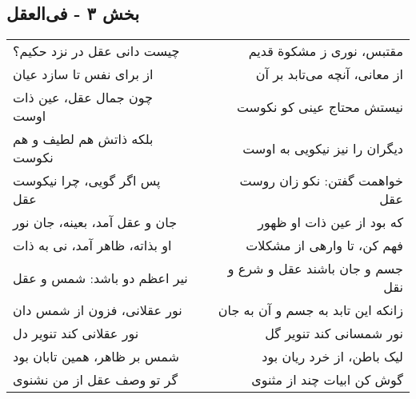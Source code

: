 \begin{center}
\section*{بخش ۳ - فی‌العقل}
\label{sec:003}
\begin{longtable}{l p{0.5cm} r}
چیست دانی عقل در نزد حکیم؟
&&
مقتبس، نوری ز مشکوة قدیم
\\
از برای نفس تا سازد عیان
&&
از معانی، آنچه می‌تابد بر آن
\\
چون جمال عقل، عین ذات اوست
&&
نیستش محتاج عینی کو نکوست
\\
بلکه ذاتش هم لطیف و هم نکوست
&&
دیگران را نیز نیکویی به اوست
\\
پس اگر گویی، چرا نیکوست عقل
&&
خواهمت گفتن: نکو زان روست عقل
\\
جان و عقل آمد، بعینه، جان نور
&&
که بود از عین ذات او ظهور
\\
او بذاته، ظاهر آمد، نی به ذات
&&
فهم کن، تا وارهی از مشکلات
\\
نیر اعظم دو باشد: شمس و عقل
&&
جسم و جان باشند عقل و شرع و نقل
\\
نور عقلانی، فزون از شمس دان
&&
زانکه این تابد به جسم و آن به جان
\\
نور عقلانی کند تنویر دل
&&
نور شمسانی کند تنویر گل
\\
شمس بر ظاهر، همین تابان بود
&&
لیک باطن، از خرد ریان بود
\\
گر تو وصف عقل از من نشنوی
&&
گوش کن ابیات چند از مثنوی
\\
\end{longtable}
\end{center}
